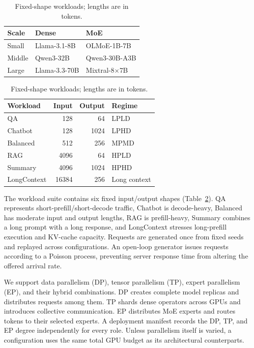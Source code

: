 \begin{table}[t]
  \centering
  \begin{minipage}[t]{0.42\textwidth}
    \caption{Models included in the measurement matrix.}
    \label{tab:models}
    \centering
    \small
    \begin{tabular}{lll}
      \toprule
      Scale & Dense & MoE \\
      \midrule
      Small  & Llama-3.1-8B & OLMoE-1B-7B \\
      Middle & Qwen3-32B & Qwen3-30B-A3B \\
      Large  & Llama-3.3-70B & Mixtral-8$\times$7B \\
      \bottomrule
    \end{tabular}
  \end{minipage}
  \hfill
  \begin{minipage}[t]{0.54\textwidth}
    \caption{Fixed-shape workloads; lengths are in tokens.}
    \label{tab:workloads}
    \centering
    \small
    \begin{tabular}{lrrl}
      \toprule
      Workload & Input & Output & Regime \\
      \midrule
      QA          & 128   & 64   & LPLD \\
      Chatbot     & 128   & 1024 & LPHD \\
      Balanced    & 512   & 256  & MPMD \\
      RAG         & 4096  & 64   & HPLD \\
      Summary     & 4096  & 1024 & HPHD \\
      LongContext & 16384 & 256  & Long context \\
      \bottomrule
    \end{tabular}
  \end{minipage}
\end{table}

The workload suite contains six fixed input/output shapes (Table~\ref{tab:workloads}). QA represents short-prefill/short-decode traffic, Chatbot is decode-heavy, Balanced has moderate input and output lengths, RAG is prefill-heavy, Summary combines a long prompt with a long response, and LongContext stresses long-prefill execution and KV-cache capacity. Requests are generated once from fixed seeds and replayed across configurations. An open-loop generator issues requests according to a Poisson process, preventing server response time from altering the offered arrival rate.



We support data parallelism (DP), tensor parallelism (TP), expert parallelism (EP), and their hybrid combinations. DP creates complete model replicas and distributes requests among them. TP shards dense operators across GPUs and introduces collective communication. EP distributes MoE experts and routes tokens to their selected experts. A deployment manifest records the DP, TP, and EP degree independently for every role. Unless parallelism itself is varied, a configuration uses the same total GPU budget as its architectural counterparts.


